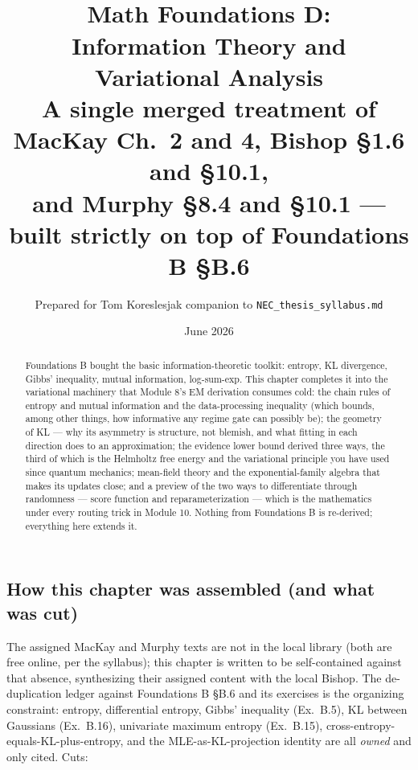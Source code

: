 \documentclass[11pt]{article}
\title{\vspace{-1.2em}{\large\sffamily Foundations for a Quant Research Pipeline}\\[0.4em]
\textbf{Math Foundations D:\\ Information Theory and Variational Analysis}\\[0.3em]
{\large A single merged treatment of MacKay Ch.\ 2 and 4, Bishop \S1.6 and \S10.1,\\ and Murphy \S8.4 and \S10.1 --- built strictly on top of Foundations B \S B.6}}
\author{Prepared for Tom Koreslesjak \;\textperiodcentered\; companion to \texttt{NEC\_thesis\_syllabus.md}}
\date{June 2026}
\numberwithin{equation}{section}
\theoremstyle{plain}
\theoremstyle{definition}
\theoremstyle{remark}
\newcounter{exercise}
\begin{document}
\maketitle
\vspace{-1.5em}

\begin{abstract}
\noindent Foundations B bought the basic information-theoretic toolkit: entropy, KL divergence, Gibbs' inequality, mutual information, log-sum-exp. This chapter completes it into the variational machinery that Module 8's EM derivation consumes cold: the chain rules of entropy and mutual information and the data-processing inequality (which bounds, among other things, how informative any regime gate can possibly be); the geometry of KL --- why its asymmetry is structure, not blemish, and what fitting in each direction does to an approximation; the evidence lower bound derived three ways, the third of which is the Helmholtz free energy and the variational principle you have used since quantum mechanics; mean-field theory and the exponential-family algebra that makes its updates close; and a preview of the two ways to differentiate through randomness --- score function and reparameterization --- which is the mathematics under every routing trick in Module 10. Nothing from Foundations B is re-derived; everything here extends it.
\end{abstract}

\tableofcontents

\subsection*{How this chapter was assembled (and what was cut)}

The assigned MacKay and Murphy texts are not in the local library (both are free online, per the syllabus); this chapter is written to be self-contained against that absence, synthesizing their assigned content with the local Bishop. The de-duplication ledger against Foundations B \S B.6 and its exercises is the organizing constraint: entropy, differential entropy, Gibbs' inequality (Ex.\ B.5), KL between Gaussians (Ex.\ B.16), univariate maximum entropy (Ex.\ B.15), cross-entropy-equals-KL-plus-entropy, and the MLE-as-KL-projection identity are all \emph{owned} and only cited. Cuts:
\end{document}
